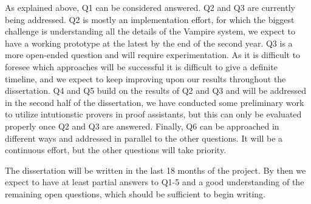 \documentclass{article}
\theoremstyle{definition}
\theoremstyle{definition}
\theoremstyle{definition}
\theoremstyle{definition}
\theoremstyle{definition}
\theoremstyle{definition}
\theoremstyle{definition}
\newcommand{\0}{\mathbf 0}
\newcommand{\1}{\mathbf 1}
\newcounter{question}
\begin{document}

	As explained above, Q1 can be considered answered. Q2 and Q3 are currently being addressed. Q2 is mostly an implementation effort, for which the biggest challenge is understanding all the details of the Vampire system, we expect to have a working prototype at the latest by the end of the second year. Q3 is a more open-ended question and will require experimentation. As it is difficult to foresee which approaches will be successful it is difficult to give a definite timeline, and we expect to keep improving upon our results throughout the dissertation.
	Q4 and Q5 build on the results of Q2 and Q3 and will be addressed in the second half of the dissertation, we have conducted some preliminary work to utilize intutionstic provers in proof assistants, but this can only be evaluated properly once Q2 and Q3 are answered. Finally, Q6 can be approached in different ways and addressed in parallel to the other questions. It will be a continuous effort, but the other questions will take priority.

	The dissertation will be written in the last 18 months of the project. By then we expect to have at least partial answers to Q1-5 and a good understanding of the remaining open questions, which should be sufficient to begin writing.
\end{document}
